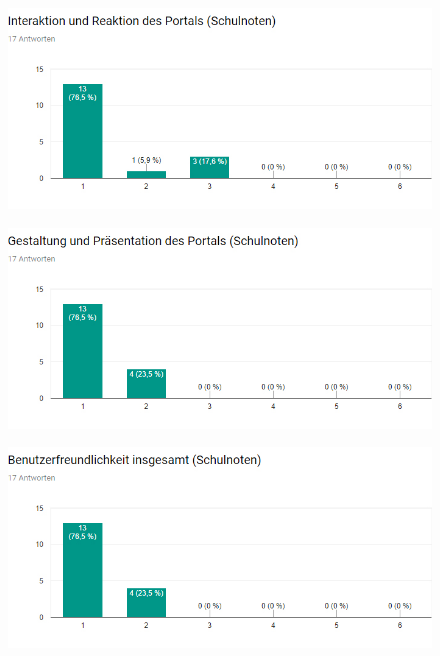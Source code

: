 \begin{figure}[H]
    \centering
    \includegraphics[width=15cm]{diagrams/ErgebnisStatSchul2.jpg}
    \label{ErgebnisSchul2}
\end{figure}

\begin{figure}[H]
    \centering
    \includegraphics[width=15cm]{diagrams/ErgebnisStatSchul3.jpg}
    \label{ErgebnisSchul3}
\end{figure}

\begin{figure}[H]
    \centering
    \includegraphics[width=15cm]{diagrams/ErgebnisStatSchul4.jpg}
    \label{ErgebnisSchul4}
\end{figure}